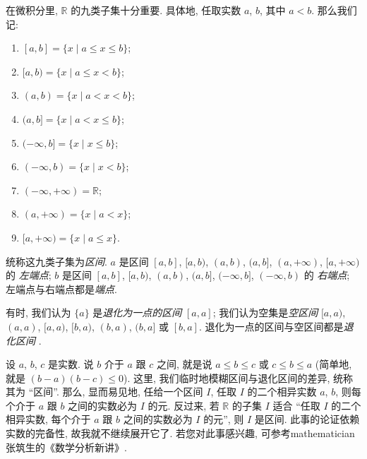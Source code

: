 \begin{definition}
    在微积分里, $\mathbb{R}$ 的九类子集十分重要.
    具体地, 任取实数 $a$, $b$, 其中 $a < b$.
    那么我们记:
    \begin{enumerate}
        \item $[a, b] = \{ x \mid a \leq x \leq b \}$;
        \item $[a, b) = \{ x \mid a \leq x < b \}$;
        \item $(a, b) = \{ x \mid a < x < b \}$;
        \item $(a, b] = \{ x \mid a < x \leq b \}$;
        \item $(-\infty, b] = \{ x \mid x \leq b \}$;
        \item $(-\infty, b) = \{ x \mid x < b \}$;
        \item $(-\infty, +\infty) = \mathbb{R}$;
        \item $(a, +\infty) = \{ x \mid a < x \}$;
        \item $[a, +\infty) = \{ x \mid a \leq x \}$.
    \end{enumerate}
    统称这九类子集为\emph{区间}.
    $a$ 是区间 $[a, b]$,
    $[a, b)$, $(a, b)$, $(a, b]$,
    $(a, +\infty)$, $[a, +\infty)$ 的%
                    \emph{左端点};
                $b$ 是区间 $[a, b]$,
                $[a, b)$, $(a, b)$, $(a, b]$,
                $(-\infty, b]$, $(-\infty, b)$ 的%
    \emph{右端点};
    左端点与右端点都是\emph{端点}.

    有时, 我们认为 $\{ a \}$ 是\emph{退化为一点的区间}%
    $[a, a]$;
    我们认为空集是\emph{空区间}%
    $[a, a)$, $(a, a)$, $[a, a)$,
    $[b, a)$, $(b, a)$, $(b, a]$
    或 $[b, a]$.
    退化为一点的区间与空区间都是\emph{退化区间}%
    .
\end{definition}

\begin{remark}
    设 $a$, $b$, $c$ 是实数.
    说 $b$ 介于 $a$ 跟 $c$ 之间,
    就是说 $a \leq b \leq c$ 或 $c \leq b \leq a$
    (简单地, 就是 $(b - a)(b - c) \leq 0$).
    这里, 我们临时地模糊区间与退化区间的差异,
    统称其为 ``区间''.
    那么, 显而易见地,
    任给一个区间 $I$,
    任取 $I$ 的二个相异实数 $a$, $b$,
    则每个介于 $a$ 跟 $b$ 之间的实数必为 $I$ 的元.
    反过来, 若 $\mathbb{R}$ 的子集 $I$ 适合
    ``任取 $I$ 的二个相异实数,
    每个介于 $a$ 跟 $b$ 之间的实数必为 $I$ 的元'',
    则 $I$ 是区间.
    此事的论证依赖实数的完备性,
    故我就不继续展开它了.
    若您对此事感兴趣,
    可参考\gls{mathematician}张筑生的《数学分析新讲》.
\end{remark}

